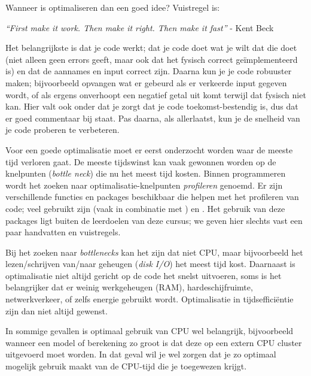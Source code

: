 \documentclass[a4paper,11pt, fleqn]{article}
\begin{document}
Wanneer is optimaliseren dan een goed idee? Vuistregel is:

\qquad \textit{``First make it work. Then make it right. Then make it fast''} - Kent Beck

Het belangrijkste is dat je code werkt; dat je code doet wat je wilt dat die doet (niet alleen geen errors geeft, maar ook dat het fysisch correct ge\"implementeerd is) en dat de aannames en input correct zijn. Daarna kun je je code robuuster maken; bijvoorbeeld opvangen wat er gebeurd als er verkeerde input gegeven wordt, of als ergens onverhoopt een negatief getal uit komt terwijl dat fysisch niet kan. Hier valt ook onder dat je zorgt dat je code toekomst-bestendig is, dus dat er goed commentaar bij staat. Pas daarna, als allerlaatst, kun je de snelheid van je code proberen te verbeteren.

Voor een goede optimalisatie moet er eerst onderzocht worden waar de meeste tijd verloren gaat. De meeste tijdswinst kan vaak gewonnen worden op de knelpunten (\textit{bottle neck}) die nu het meest tijd kosten. Binnen programmeren wordt het zoeken naar optimalisatie-knelpunten \textit{profileren} genoemd. Er zijn verschillende functies en packages beschikbaar die helpen met het profileren van code; veel gebruikt zijn  (vaak in combinatie met ) en . Het gebruik van deze packages ligt buiten de leerdoelen van deze cursus; we geven hier slechts vast een paar handvatten en vuistregels.

Bij het zoeken naar \textit{bottlenecks} kan het zijn dat niet CPU, maar bijvoorbeeld het lezen/schrijven van/naar geheugen (\textit{disk I/O}) het meest tijd kost. Daarnaast is optimalisatie niet altijd gericht op de code het snelst uitvoeren, soms is het belangrijker dat er weinig werkgeheugen (RAM), hardeschijfruimte, netwerkverkeer, of zelfs energie gebruikt wordt. Optimalisatie in tijdseffici\"entie zijn dan niet altijd gewenst.

In sommige gevallen is optimaal gebruik van CPU wel belangrijk, bijvoorbeeld wanneer een model of berekening zo groot is dat deze op een extern CPU cluster uitgevoerd moet worden. In dat geval wil je wel zorgen dat je zo optimaal mogelijk gebruik maakt van de CPU-tijd die je toegewezen krijgt.
\end{document}
